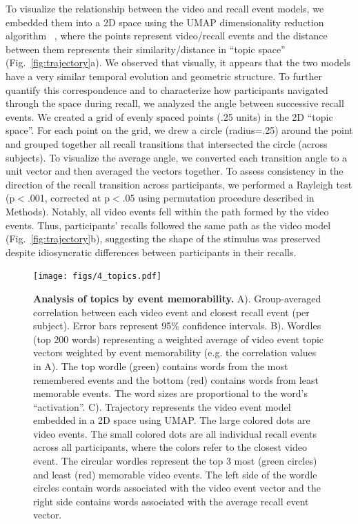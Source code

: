 \documentclass{article}
\begin{document}
{To visualize the relationship between the video and recall event models, we embedded them into a 2D space using the UMAP dimensionality reduction algorithm ~\citep{McInHeal18}, where the points represent video/recall events and the distance between them represents their similarity/distance in ``topic space'' (Fig.~\ref{fig:trajectory}a).  We observed that visually, it appears that the two models have a very similar temporal evolution and geometric structure. To further quantify this correspondence and to characterize how participants navigated through the space during recall, we analyzed the angle between successive recall events. We created a grid of evenly spaced points (.25 units) in the 2D ``topic space''. For each point on the grid, we drew a circle (radius=.25) around the point and grouped together all recall transitions that intersected the circle (across subjects). To visualize the average angle, we converted each transition angle to a unit vector and then averaged the vectors together. To assess consistency in the direction of the recall transition across participants, we performed a Rayleigh test (p$<$.001, corrected at p$<$.05 using permutation procedure described in Methods). Notably, all video events fell within the path formed by the video events.  Thus, participants' recalls followed the same path as the video model (Fig.~\ref{fig:trajectory}b), suggesting the shape of the stimulus was preserved despite idiosyncratic differences between participants in their recalls.


\begin{figure}[t!]
\centering
\texttt{[image: figs/4\_topics.pdf]}
\caption{\small \textbf{Analysis of topics by event memorability.} A). Group-averaged correlation between each video event and closest recall event (per subject). Error bars represent 95\% confidence intervals. B). Wordles (top 200 words) representing a weighted average of video event topic vectors weighted by event memorability (e.g. the correlation values in A). The top wordle (green) contains words from the most remembered events and the bottom (red) contains words from least memorable events. The word sizes are proportional to the word's ``activation''. C). Trajectory represents the video event model embedded in a 2D space using UMAP. The large colored dots are video events. The small colored dots are all individual recall events across all participants, where the colors refer to the closest video event. The circular wordles represent the top 3 most (green circles) and least (red) memorable video events.  The left side of the wordle circles contain words associated with the video event vector and the right side contains words associated with the average recall event vector.}
\label{fig:topics}
\end{figure}

}
\end{document}

